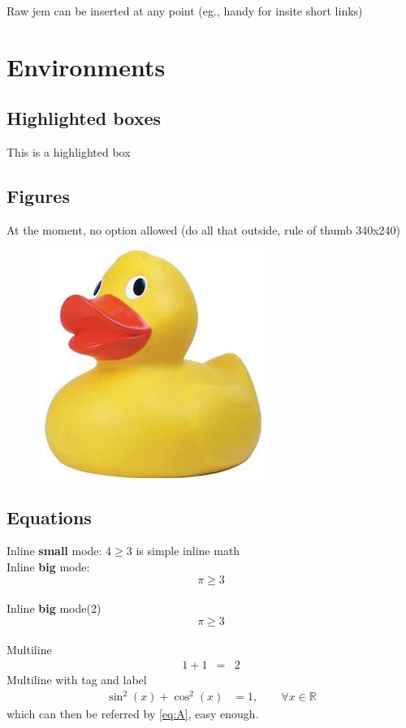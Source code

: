 Raw jem can be inserted at any point (eg., handy for insite short links)
\section{Environments}
\subsection{Highlighted boxes}
\begin{ybox} This is a highlighted box \end{ybox}

\subsection{Figures}
At the moment, no option allowed (do all that outside, rule of thumb 340x240)
\begin{figure}[!h]\center\includegraphics{_figs/rubber-duck.jpg}\end{figure}

\subsection{Equations}
Inline \textbf{small} mode: $4 \ge 3$ is simple inline math\\
Inline \textbf{big} mode:   $$\pi\ge3$$\\
Inline \textbf{big} mode(2) $$\pi\ge3$$\\
Multiline
\begin{eqnarray} 1+1&=&2\end{eqnarray}
Multiline with tag and label
\begin{align}
  \sin^2(x)+\cos^2(x) &= 1, \qquad \forall x\in\mathbb R \label{eq:A}\tag{A}
\end{align}
which can then be referred by \eqref{eq:A}, easy enough.\\

